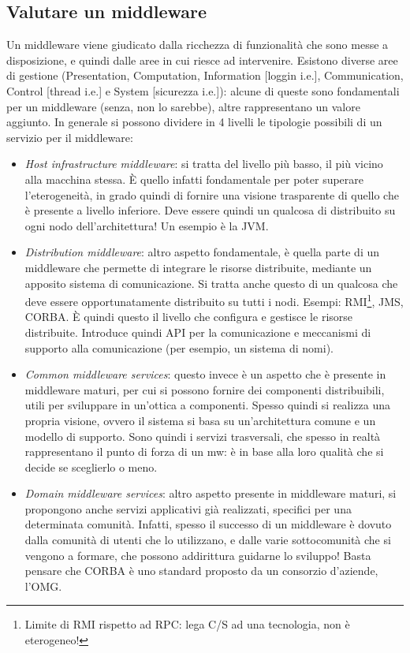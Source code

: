 \subsection{Valutare un middleware}
Un middleware viene giudicato dalla ricchezza di funzionalità che sono messe a disposizione, e quindi dalle aree in 
cui riesce ad intervenire. Esistono diverse aree di gestione (Presentation, Computation, Information [loggin i.e.],
Communication, Control [thread i.e.] e System [sicurezza i.e.]): alcune di queste sono fondamentali per un middleware
(senza, non lo sarebbe), altre rappresentano un valore aggiunto.
In generale si possono dividere in 4 livelli le tipologie possibili di un servizio per il middleware:
\begin{itemize}
 \item \textit{Host infrastructure middleware}: si tratta del livello più basso, il più vicino alla macchina stessa. 
 È quello infatti fondamentale per poter superare l'eterogeneità, in grado quindi di fornire una visione trasparente 
 di quello che è presente a livello inferiore. Deve essere quindi un qualcosa di distribuito su ogni nodo
 dell'architettura! Un esempio è la JVM.
 \item \textit{Distribution middleware}: altro aspetto fondamentale, è quella parte di un middleware che permette di
 integrare le risorse distribuite, mediante un apposito sistema di comunicazione. Si tratta anche questo di un 
 qualcosa che deve essere opportunatamente distribuito su tutti i nodi. Esempi: RMI\footnote{Limite di RMI rispetto 
 ad RPC: lega C/S ad una tecnologia, non è eterogeneo!}, JMS, CORBA. È quindi questo il livello che configura e
 gestisce le risorse distribuite. Introduce quindi API per la comunicazione e meccanismi  di supporto alla 
 comunicazione (per esempio, un sistema di nomi).
 \item \textit{Common middleware services}: questo invece è un aspetto che è presente in middleware maturi, per cui si
 possono fornire dei componenti distribuibili, utili per sviluppare in un'ottica a componenti. Spesso quindi si realizza
 una propria visione, ovvero il sistema si basa su un'architettura comune e un modello di supporto. Sono quindi i
 servizi trasversali, che spesso in realtà rappresentano il punto di forza di un mw: è in base alla loro qualità
 che si decide se sceglierlo o meno.
 \item \textit{Domain middleware services}: altro aspetto presente in middleware maturi, si propongono anche servizi 
 applicativi già realizzati, specifici per una determinata comunità. Infatti, spesso il successo di un middleware è
 dovuto dalla comunità di utenti che lo utilizzano, e dalle varie sottocomunità che si vengono a formare, che possono
 addirittura guidarne lo sviluppo! Basta pensare che CORBA è uno standard proposto da un consorzio d'aziende, l'OMG.
\end{itemize}

